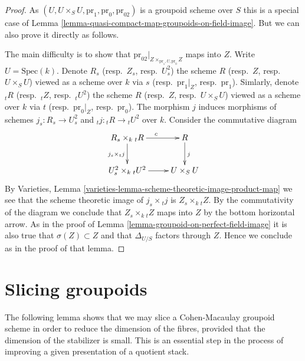 \begin{proof}
As $(U, U \times_S U, \text{pr}_1, \text{pr}_0, \text{pr}_{02})$
is a groupoid scheme over $S$ this is a special case of
Lemma \ref{lemma-quasi-compact-map-groupoids-on-field-image}.
But we can also prove it directly as follows.

\medskip\noindent
The main difficulty is to show that
$\text{pr}_{02}|_{Z \times_{\text{pr}_1, U, \text{pr}_0} Z}$
maps into $Z$.
Write $U = \text{Spec}(k)$. Denote
$R_s$ (resp.\ $Z_s$, resp.\ $U^2_s$) the scheme
$R$ (resp.\ $Z$, resp.\ $U \times_S U$) viewed as a scheme over $k$ via
$s$ (resp.\ $\text{pr}_1|_Z$, resp.\ $\text{pr}_1$).
Simlarly, denote
${}_tR$ (resp.\ ${}_tZ$, resp.\ ${}_tU^2$) the scheme
$R$ (resp.\ $Z$, resp.\ $U \times_S U$) viewed as a scheme over $k$ via
$t$ (resp.\ $\text{pr}_0|_Z$, resp.\ $\text{pr}_0$).
The morphism $j$ induces morphisms of schemes
$j_s : R_s \to U^2_s$ and ${}_tj : {}_tR \to {}_tU^2$ over $k$.
Consider the commutative diagram
$$
\xymatrix{
R_s \times_k {}_tR \ar[r]^c \ar[d]_{j_s \times {}_tj} &  R \ar[d]^j \\
U^2_s \times_k {}_tU^2 \ar[r] & U \times_S U
}
$$
By
Varieties, Lemma \ref{varieties-lemma-scheme-theoretic-image-product-map}
we see that the scheme theoretic image of $j_s \times {}_tj$ is
$Z_s \times_k {}_tZ$. By the commutativity of the diagram we
conclude that $Z_s \times_k {}_tZ$ maps into $Z$ by the bottom
horizontal arrow. As in the proof of
Lemma \ref{lemma-groupoid-on-perfect-field-image}
it is also true that $\sigma(Z) \subset Z$ and that
$\Delta_{U/S}$ factors through $Z$. Hence we conclude as in the
proof of that lemma.
\end{proof}







\section{Slicing groupoids}
\label{section-slicing}

\noindent
The following lemma shows that we may slice a Cohen-Macaulay groupoid scheme
in order to reduce the dimension of the fibres, provided that the
dimension of the stabilizer is small. This is an essential step in
the process of improving a given presentation of a quotient stack.

